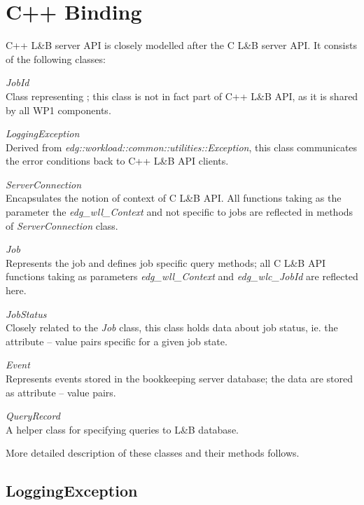 \documentclass{egee}
\def\LB{L\&B\xspace}
\begin{document}
\section{C++ Binding}
C++ \LB{} server API is closely modelled after the C \LB{} server
API. It consists of the following classes:
\begin{description}

\item{\emph{JobId}}\\
Class representing \jobid; this class is not in
fact part of C++ \LB API, as it is shared by all WP1 components.

\item{\emph{LoggingException}}\\
Derived from
\emph{edg::workload::common::utilities::Exception}, this class
communicates the error conditions back to C++ \LB API clients.

\item{\emph{ServerConnection}}\\
Encapsulates the notion of context of C \LB API. All
functions taking as the parameter the \emph{edg\_wll\_Context} and not specific
to jobs are reflected in methods of \emph{ServerConnection} class. 

\item{\emph{Job}}\\
Represents the job and defines job specific query methods;
all C \LB API functions taking as parameters \emph{edg\_wll\_Context} and
\emph{edg\_wlc\_JobId} are reflected here. 

\item{\emph{JobStatus}}\\
Closely related to the \emph{Job} class, this class holds data
about job status, ie. the attribute -- value pairs specific
for a given job state. 

\item{\emph{Event}}\\
Represents events stored in the bookkeeping
server database; the data are stored as attribute -- value pairs.

\item{\emph{QueryRecord}}\\
A helper class for specifying queries to \LB
database. 
\end{description}

\noindent More detailed description of these classes and their methods
follows.

\subsection*{LoggingException}
\end{document}
